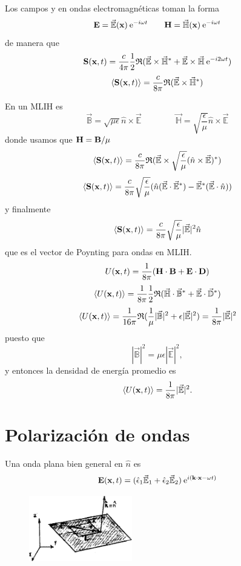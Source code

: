 \documentclass[10pt,oneside]{CBFT_book}
\begin{document}
Los campos  y  en ondas electromagnéticas toman la forma 
\[
	\vb{E} = \vec{\mathbb{E}}(\vb{x})\euler^{-i\omega t} \qquad 
	\vb{H} = \vec{\mathbb{H}}(\vb{x})\euler^{-i\omega t}
\]
de manera que 
\[
	\vb{S}( \vb{x},t ) = \frac{c}{4\pi} \frac{1}{2} \re( \vec{\mathbb{E}} \times \vec{\mathbb{H}}^* + 
		\vec{\mathbb{E}} \times \vec{\mathbb{H}} \euler^{-i2\omega t})
\]
\[
	\langle \vb{S}( \vb{x},t ) \rangle = \frac{c}{8\pi} \re( \vec{\mathbb{E}} \times \vec{\mathbb{H}}^* ) 
\]

En un MLIH es 
\[
	\vec{\mathbb{B}} = \sqrt{ \mu \epsilon } \hat{n} \times \vec{\mathbb{E}} \qquad\qquad 
	\vec{\mathbb{H}} = \sqrt{ \frac{\epsilon}{\mu } } \hat{n} \times \vec{\mathbb{E}}
\]
donde usamos que $\vb{H} = \vb{B}/\mu$
\[
	\langle \vb{S}( \vb{x},t ) \rangle = \frac{c}{8\pi} \re( \vec{\mathbb{E}} \times 
		\sqrt{\frac{\epsilon}{\mu}}(\hat{n} \times \vec{\mathbb{E}})^* )
\]
\[
	\langle \vb{S}( \vb{x},t ) \rangle = \frac{c}{8\pi} \sqrt{\frac{\epsilon}{\mu}} 
		( \hat{n} (\vec{\mathbb{E}}\cdot\vec{\mathbb{E}}^*) - 
		\vec{\mathbb{E}}^*(\vec{\mathbb{E}}\cdot\hat{n}) )
\]
y finalmente
\[
	\langle \vb{S}( \vb{x},t ) \rangle = \frac{c}{8\pi} 
		\sqrt{\frac{\epsilon}{\mu}}|\vec{\mathbb{E}}|^2 \hat{n}
\]
que es el vector de Poynting para ondas en MLIH.
\[
	U(\vb{x},t) = \frac{1}{8\pi}( \pe{H}{B} + \pe{E}{D} )
\]
\[
	\langle U(\vb{x},t) \rangle = \frac{1}{8\pi} \frac{1}{2} \re ( 
	\vec{\mathbb{H}}\cdot\vec{\mathbb{B}}^* + \vec{\mathbb{E}}\cdot\vec{\mathbb{D}}^* )
\]
\[
	\langle U(\vb{x},t) \rangle = \frac{1}{16\pi}
		\re ( \frac{1}{\mu} |\vec{\mathbb{B}}|^2 + \epsilon |\vec{\mathbb{E}}|^2 ) =
		\frac{1}{8\pi} |\vec{\mathbb{E}}|^2
\]
puesto que 
\[
	|\vec{\mathbb{B}}|^2 = \mu\epsilon |\vec{\mathbb{E}}|^2,	
\]
y entonces la densidad de energía promedio es
\[
		\langle U(\vb{x},t) \rangle = \frac{1}{8\pi} |\vec{\mathbb{E}}|^2.
\]

\section{Polarización de ondas}

Una onda plana bien general en $\hat{n}$ es 
\[
	\vb{E}( \vb{x},t )=(\hat{\epsilon}_1 \vec{\mathbb{E}}_1 + 
			\hat{\epsilon}_2\vec{\mathbb{E}}_2) \euler^{i( \pe{k}{x} -\omega t)}
\]

\begin{figure}[htb]
	\begin{center}
	\includegraphics[width=0.4\textwidth]{images/fig_ft1_polariz.pdf}	 
	\end{center}
	\caption{}
\end{figure} 
\end{document}
